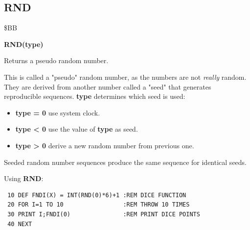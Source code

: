 
\newpage
\subsection{RND}
\begin{description}[leftmargin=2cm,style=nextline]
\item [Token:] \$BB
\item [Format:] {\bf RND(type)}
\item [Usage:] Returns a pseudo random number.

               This is called a "pseudo" random number, as
               the numbers are not {\it really} random. They are derived
               from another number called a "seed" that generates
               reproducible sequences. {\bf type}
               determines which seed is used:

                \begin{itemize}
                    \item {\bf type = 0} use system clock.
                    \item {\bf type < 0} use the value of {\bf type} as seed.
                    \item {\bf type > 0} derive a new random number from previous one.
                \end{itemize}

\item [Remarks:] Seeded random number sequences produce the same
                 sequence for identical seeds.
\item [Example:] Using {\bf RND}:
\begin{tcolorbox}[colback=black,coltext=white]
\verbatimfont{\codefont}
\begin{verbatim}
 10 DEF FNDI(X) = INT(RND(0)*6)+1 :REM DICE FUNCTION
 20 FOR I=1 TO 10                 :REM THROW 10 TIMES
 30 PRINT I;FNDI(0)               :REM PRINT DICE POINTS
 40 NEXT
\end{verbatim}
\end{tcolorbox}
\end{description}


\newpage
